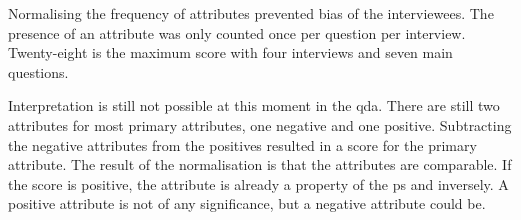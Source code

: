  Normalising the frequency of \glspl{attribute} prevented bias of the interviewees. The presence of an attribute was only counted once per question per interview. Twenty-eight is the maximum score with four interviews and seven main questions.
 
 Interpretation is still not possible at this moment in the \acrshort{qda}. There are still two \glspl{attribute} for most primary \glspl{attribute}, one negative and one positive. Subtracting the negative \glspl{attribute} from the positives resulted in a score for the primary \gls{attribute}. The result of the normalisation is that the \glspl{attribute} are comparable. If the score is positive, the \gls{attribute} is already a property of the \gls{ps} and inversely. A positive \gls{attribute} is not of any significance, but a negative attribute could be.
 
